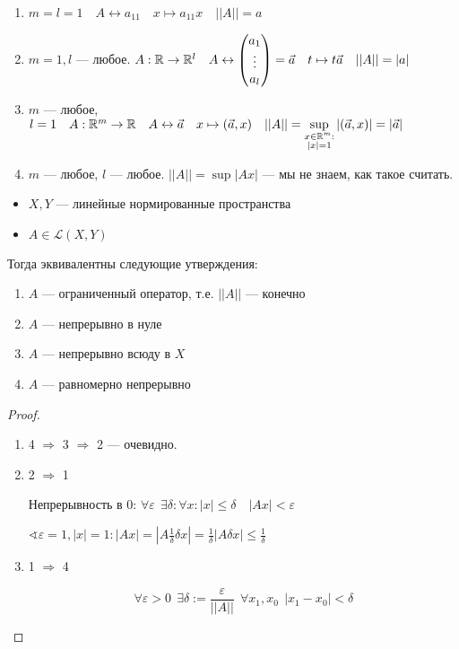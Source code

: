 \begin{example}
    \begin{enumerate}
        \item $m=l=1 \quad A \leftrightarrow a_{11} \quad x \mapsto a_{11}x \quad ||A||=a$
        \item $m=1, l$ --- любое. $A : \mathbb{R}\to\mathbb{R}^l \quad A\leftrightarrow \begin{pmatrix}
                      a_1    \\
                      \vdots \\
                      a_l
                  \end{pmatrix} = \vec a \quad t\mapsto t\vec a \quad ||A||=|a|$
        \item $m$ --- любое, $l=1 \quad A : \mathbb{R}^m\to\mathbb{R} \quad A\leftrightarrow \vec a \quad x\mapsto (\vec a, x) \quad ||A||=\sup\limits_{\substack{x\in\mathbb{R}^m :\\ |x|=1}} |(\vec a, x)| = |\vec a|$
        \item $m$ --- любое, $l$ --- любое. $||A||=\sup|Ax|$ --- мы не знаем, как такое считать.
    \end{enumerate}
\end{example}

\begin{lemma}
    \itemfix
    \begin{itemize}
        \item $X, Y$ --- линейные нормированные пространства
        \item $A\in \mathcal L(X, Y)$
    \end{itemize}
    Тогда эквивалентны следующие утверждения:
    \begin{enumerate}
        \item $A$ --- ограниченный оператор, т.е. $||A||$ --- конечно
        \item $A$ --- непрерывно в нуле
        \item $A$ --- непрерывно всюду в $X$
        \item $A$ --- равномерно непрерывно
    \end{enumerate}
\end{lemma}

\begin{proof}
    \itemfix
    \begin{enumerate}
        \item 4 $\Rightarrow$ 3 $\Rightarrow$ 2 --- очевидно.
        \item 2 $\Rightarrow$ 1

              Непрерывность в $0$: $\forall \varepsilon \ \ \exists \delta : \forall x : |x| \le \delta \quad |Ax|<\varepsilon$

              $\sphericalangle \varepsilon = 1, |x|=1 : |Ax| = \left|A\frac{1}{\delta}\delta x\right| = \frac{1}{\delta} |A \delta x| \le \frac{1}{\delta}$
        \item 1 $\Rightarrow$ 4

              $$\forall \varepsilon > 0 \ \ \exists \delta := \frac{\varepsilon}{||A||} \ \ \forall x_1, x_0 \ \ |x_1-x_0| < \delta$$
    \end{enumerate}
\end{proof}

